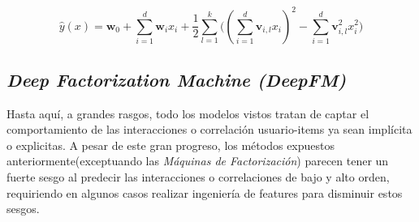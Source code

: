 \documentclass[11pt,a4paper,twoside]{thesis}
\begin{document}
\begin{equation}
	\hat{y}(x) = \mathbf{w}_0 + \sum_{i=1}^d \mathbf{w}_i x_i + \frac{1}{2} \sum_{l=1}^k \big ((\sum_{i=1}^d \mathbf{v}_{i, l} x_i)^2 - \sum_{i=1}^d \mathbf{v}_{i, l}^2 x_i^2)
\end{equation}


\clearpage


\subsection{\textit{Deep Factorization Machine (DeepFM)}}

Hasta aquí, a grandes rasgos, todo los modelos vistos tratan de captar el comportamiento de las interacciones o correlación usuario-items ya sean implícita o explicitas. A pesar de este gran progreso, los métodos expuestos anteriormente(exceptuando las \textit{Máquinas de Factorización}) parecen tener un fuerte sesgo al predecir las interacciones o correlaciones de bajo y alto orden, requiriendo en algunos casos realizar ingeniería de features para disminuir estos sesgos. 
\end{document}
